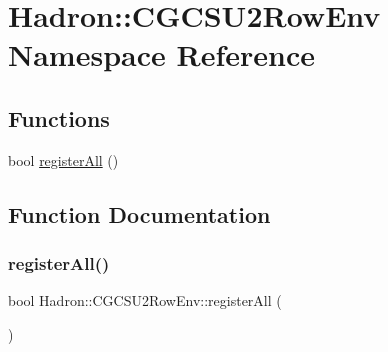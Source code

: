 \hypertarget{namespaceHadron_1_1CGCSU2RowEnv}{}\section{Hadron\+:\+:C\+G\+C\+S\+U2\+Row\+Env Namespace Reference}
\label{namespaceHadron_1_1CGCSU2RowEnv}
\subsection*{Functions}
\begin{DoxyCompactItemize}
\item 
bool \mbox{\hyperlink{namespaceHadron_1_1CGCSU2RowEnv_a613b8fd4057061e97fd9c03d53dfc4e8}{register\+All}} ()
\end{DoxyCompactItemize}


\subsection{Function Documentation}
\mbox{\label{namespaceHadron_1_1CGCSU2RowEnv_a613b8fd4057061e97fd9c03d53dfc4e8}} 
\subsubsection{\texorpdfstring{registerAll()}{registerAll()}}
{\footnotesize\ttfamily bool Hadron\+::\+C\+G\+C\+S\+U2\+Row\+Env\+::register\+All (\begin{DoxyParamCaption}{ }\end{DoxyParamCaption})}

